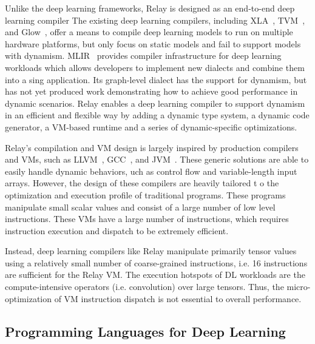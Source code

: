 Unlike the deep learning frameworks, Relay is designed as an end-to-end deep learning compiler The existing deep learning compilers, including XLA~\citep{xla}, TVM~\citep{tvm_osdi18}, and Glow~\citep{glow}, offer a means to compile deep learning models to run on multiple hardware platforms, but only focus on static models and fail to support models with dynamism.
MLIR~\citep{lattner2020mlir} provides compiler infrastructure for deep learning workloads which allows developers to implement new dialects and combine them into a sing application. Its graph-level dialect has the support for dynamism, but has not yet produced work demonstrating how to achieve good performance in dynamic scenarios.
Relay enables a deep learning compiler to support dynamism in an efficient and flexible way by adding a dynamic type system, a dynamic code generator, a VM-based runtime and a series of dynamic-specific optimizations.

Relay's compilation and VM design is largely inspired by production compilers and VMs,
such as LLVM~\citep{llvm}, GCC~\citep{gcc}, and JVM~\citep{jvm}.
These generic solutions are able to easily handle dynamic behaviors,
uch as control flow and variable-length input arrays.
However, the design of these compilers are heavily tailored t
o the optimization and execution profile of traditional programs.
These programs manipulate small scalar values and consist of a large
number of low level instructions. These VMs have a large number of instructions,
which requires instruction execution and dispatch to be extremely efficient.

Instead, deep learning compilers like Relay manipulate primarily
tensor values using a relatively small number of coarse-grained instructions,
 i.e. 16 instructions are sufficient for the Relay VM. The execution hotspots
 of DL workloads are the compute-intensive operators (i.e. convolution)
 over large tensors. Thus, the micro-optimization of VM instruction
  dispatch is not essential to overall performance.

\subsection{Programming Languages for Deep Learning}
\label{sec:pl_techniques_in_dl}

